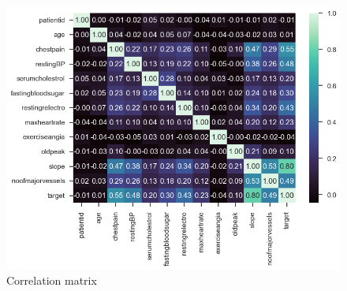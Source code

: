 \begin{figure}
    \caption{Correlation matrix}\label{correlation-matrix}
    \centering
    \includegraphics[width=\linewidth]{media/correlation-matrix.png}
\end{figure}